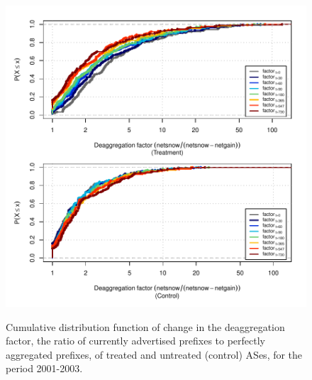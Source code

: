 \clearpage
\vspace*{1.25em}
\begin{figure}[H]
\begin{centering}
\begin{singlespace}
\captionsetup{list=no}
    \includegraphics[width=6in]
    {figures/behavior-deagg_factor-2001_2003-corr.pdf}
    \vspace{-2em}\\
    \caption{Cumulative distribution function of change in the deaggregation
    factor, the ratio of currently advertised prefixes to perfectly aggregated
    prefixes, of treated and untreated (control) ASes, for the period
    2001-2003.}
\end{singlespace}
\end{centering}
\end{figure}

